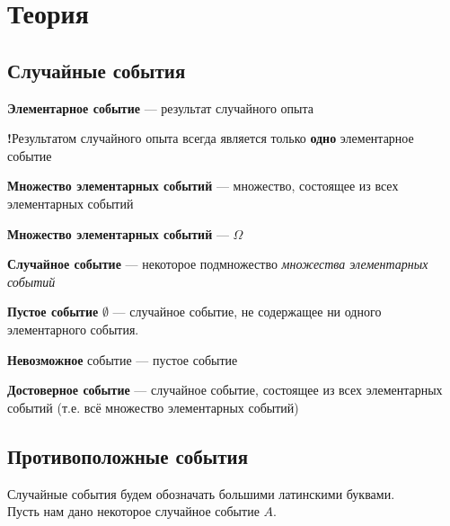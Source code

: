 
\section{Теория}

\subsection{Случайные события}

\begin{definition}
\textbf{Элементарное событие}  —  результат случайного опыта
\end{definition}

\textbf{!}Результатом случайного опыта всегда является только \textbf{одно} элементарное событие

\begin{definition}
\textbf{Множество элементарных событий}  —  множество, состоящее из всех элементарных событий
\end{definition}

\begin{designation}
\textbf{Множество элементарных событий}  —  $\Omega$
\end{designation}

\begin{definition}
\textbf{Случайное событие}  —  некоторое подмножество \emph{множества элементарных событий}
\end{definition}

\textbf{Пустое событие} $\emptyset$  —  случайное событие, не содержащее ни одного элементарного события.

\begin{definition}
\textbf{Невозможное} событие  —  пустое событие
\end{definition}

\begin{definition}
\textbf{Достоверное событие}  —  случайное событие, состоящее из всех элементарных событий (т.е. всё множество элементарных событий)
\end{definition}

\subsection{Противоположные события}

Случайные события будем обозначать большими латинскими буквами.\\
 Пусть нам дано некоторое случайное событие $A$.\\

